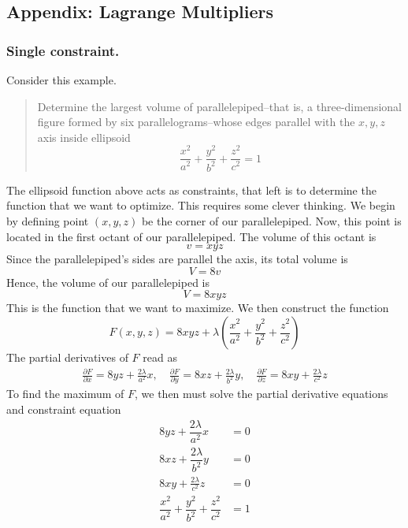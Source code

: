 \documentclass[../../Main.tex]{subfiles}
\begin{document}
\subsection*{Appendix: Lagrange Multipliers}
\subsubsection*{Single constraint.} Consider this example.
\begin{quotation}
    Determine the largest volume of parallelepiped--that is, a three-dimensional figure formed by six parallelograms--whose edges parallel with the $x,y,z$ axis inside ellipsoid
    \begin{equation*}
        \frac{x^2}{a^2}+\frac{y^2}{b^2}+\frac{z^2}{c^2}=1
    \end{equation*}
\end{quotation}
The ellipsoid function above acts as constraints, that left is to determine the function that we want to optimize. This requires some clever thinking. We begin by defining point $(x,y,z)$ be the corner of our parallelepiped. Now, this point is located in the first octant of our parallelepiped. The volume of this octant is 
\begin{equation*}
    v=xyz
\end{equation*}
Since the parallelepiped's sides are parallel the axis, its total volume is 
\begin{equation*}
    V=8v
\end{equation*}
Hence, the volume of our parallelepiped is 
\begin{equation*}
    V=8xyz
\end{equation*}
This is the function that we want to maximize. We then construct the function
\begin{equation*}
    F(x,y,z)=8xyz+\lambda\left(\frac{x^2}{a^2}+\frac{y^2}{b^2}+\frac{z^2}{c^2}\right)
\end{equation*}
The partial derivatives of $F$ read as 
\begin{align*}
    \frac{\partial F}{\partial x}=8yz+\frac{2\lambda}{a^2}x,\quad
    \frac{\partial F}{\partial y}=8xz+\frac{2\lambda}{b^2}y,\quad
    \frac{\partial F}{\partial z}=8xy+\frac{2\lambda}{c^2}z
\end{align*}
To find the maximum of $F$, we then must solve the partial derivative equations and constraint equation 
\begin{align*}
    8yz+\dfrac{2\lambda}{a^2}x&=0\\
    8xz+\dfrac{2\lambda}{b^2}y&=0\\
    8xy+\frac{2\lambda}{c^2}z&=0\\
    \dfrac{x^2}{a^2}+\dfrac{y^2}{b^2}+\dfrac{z^2}{c^2}&=1
\end{align*}
\end{document}
